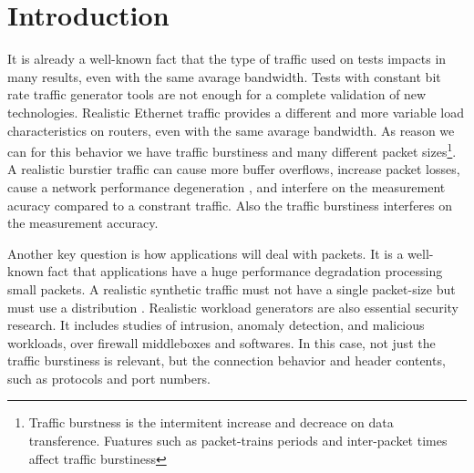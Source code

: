 \section{Introduction}\label{sec:introduction}


It is already a well-known fact that the type of traffic used on tests impacts in many results, even with the same avarage bandwidth. Tests with constant bit rate traffic generator tools are not enough for a complete validation of new technologies. Realistic Ethernet traffic provides a different and more variable load characteristics on routers\cite{harpoon-validation}, even with the same avarage bandwidth. As reason we can for this behavior we have traffic burstiness and many different packet sizes\footnote{Traffic burstness is the intermitent increase and decreace on data transference. Fuatures such as packet-trains periods and inter-packet times affect traffic burstiness}.
A realistic burstier traffic can cause more buffer overflows, increase packet losses, cause a network performance degeneration \cite{burstiness-queue-lenght} \cite{modelling-of-self-similar} \cite{empirical-interarrival-study}, and interfere on the measurement acuracy \cite{legotg-paper} \cite{background-traffic-matter} compared to a constrant traffic. Also the traffic burstiness interferes on the  measurement accuracy. 

Another key question is how applications will deal with packets. It is a well-known fact that applications have a huge performance degradation processing small packets\cite{comparative-trafficgen-tools}. A realistic synthetic traffic must not have a single packet-size but must use a distribution \cite{packet-distribution-model}.  Realistic workload generators are also essential security research\cite{ditg-paper}. It includes studies of intrusion, anomaly detection, and malicious workloads\cite{ditg-paper}, over firewall middleboxes and softwares. In this case, not just the traffic burstiness is relevant, but the connection behavior and header contents, such as protocols and port numbers.

